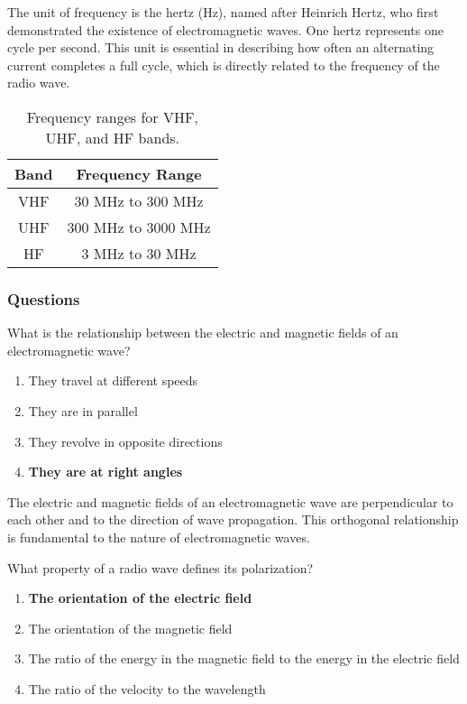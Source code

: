The unit of frequency is the hertz (Hz), named after Heinrich Hertz, who first demonstrated the existence of electromagnetic waves. One hertz represents one cycle per second. This unit is essential in describing how often an alternating current completes a full cycle, which is directly related to the frequency of the radio wave.


\begin{table}[h]
    \centering
    \begin{tabular}{|c|c|}
        \hline
        \textbf{Band} & \textbf{Frequency Range} \\
        \hline
        VHF & 30 MHz to 300 MHz \\
        UHF & 300 MHz to 3000 MHz \\
        HF & 3 MHz to 30 MHz \\
        \hline
    \end{tabular}
    \caption{Frequency ranges for VHF, UHF, and HF bands.}
    \label{tab:frequency-ranges}
\end{table}

\subsubsection*{Questions}

\begin{tcolorbox}[colback=gray!10!white,colframe=black!75!black,title={T3B01}]
What is the relationship between the electric and magnetic fields of an electromagnetic wave?
\begin{enumerate}[label=\Alph*),noitemsep]
    \item They travel at different speeds
    \item They are in parallel
    \item They revolve in opposite directions
    \item \textbf{They are at right angles}
\end{enumerate}
\end{tcolorbox}

The electric and magnetic fields of an electromagnetic wave are perpendicular to each other and to the direction of wave propagation. This orthogonal relationship is fundamental to the nature of electromagnetic waves.

\begin{tcolorbox}[colback=gray!10!white,colframe=black!75!black,title={T3B02}]
What property of a radio wave defines its polarization?
\begin{enumerate}[label=\Alph*),noitemsep]
    \item \textbf{The orientation of the electric field}
    \item The orientation of the magnetic field
    \item The ratio of the energy in the magnetic field to the energy in the electric field
    \item The ratio of the velocity to the wavelength
\end{enumerate}
\end{tcolorbox}

